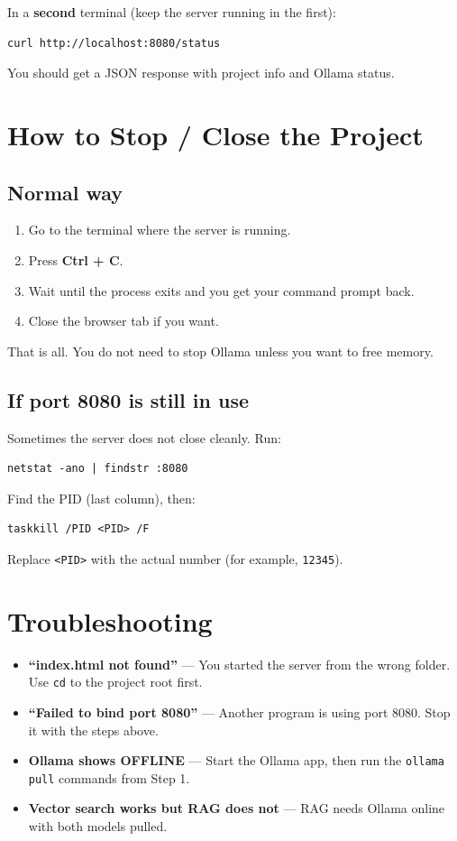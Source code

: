 \documentclass[11pt]{article}
\begin{document}
In a \textbf{second} terminal (keep the server running in the first):
\begin{lstlisting}
curl http://localhost:8080/status
\end{lstlisting}
You should get a JSON response with project info and Ollama status.

\section*{How to Stop / Close the Project}

\subsection*{Normal way}

\begin{enumerate}[leftmargin=*]
  \item Go to the terminal where the server is running.
  \item Press \textbf{Ctrl + C}.
  \item Wait until the process exits and you get your command prompt back.
  \item Close the browser tab if you want.
\end{enumerate}

That is all. You do not need to stop Ollama unless you want to free memory.

\subsection*{If port 8080 is still in use}

Sometimes the server does not close cleanly. Run:

\begin{lstlisting}
netstat -ano | findstr :8080
\end{lstlisting}

Find the PID (last column), then:

\begin{lstlisting}
taskkill /PID <PID> /F
\end{lstlisting}

Replace \texttt{<PID>} with the actual number (for example, \texttt{12345}).

\section*{Troubleshooting}

\begin{itemize}[leftmargin=*]
  \item \textbf{``index.html not found''} --- You started the server from the wrong folder. Use \texttt{cd} to the project root first.
  \item \textbf{``Failed to bind port 8080''} --- Another program is using port 8080. Stop it with the steps above.
  \item \textbf{Ollama shows OFFLINE} --- Start the Ollama app, then run the \texttt{ollama pull} commands from Step 1.
  \item \textbf{Vector search works but RAG does not} --- RAG needs Ollama online with both models pulled.
\end{itemize}
\end{document}
